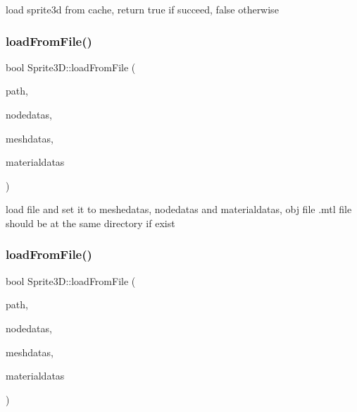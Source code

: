load sprite3d from cache, return true if succeed, false otherwise \mbox{\label{classSprite3D_a4927dfcc1a6cd4a2e7429b501da0d10d}} 
\subsubsection{\texorpdfstring{load\+From\+File()}{loadFromFile()}\hspace{0.1cm}{\footnotesize\ttfamily [1/2]}}
{\footnotesize\ttfamily bool Sprite3\+D\+::load\+From\+File (\begin{DoxyParamCaption}\item[{const std\+::string \&}]{path,  }\item[{\hyperlink{structNodeDatas}{Node\+Datas} $\ast$}]{nodedatas,  }\item[{\hyperlink{structMeshDatas}{Mesh\+Datas} $\ast$}]{meshdatas,  }\item[{\hyperlink{structMaterialDatas}{Material\+Datas} $\ast$}]{materialdatas }\end{DoxyParamCaption})}

load file and set it to meshedatas, nodedatas and materialdatas, obj file .mtl file should be at the same directory if exist \mbox{\label{classSprite3D_a4927dfcc1a6cd4a2e7429b501da0d10d}} 
\subsubsection{\texorpdfstring{load\+From\+File()}{loadFromFile()}\hspace{0.1cm}{\footnotesize\ttfamily [2/2]}}
{\footnotesize\ttfamily bool Sprite3\+D\+::load\+From\+File (\begin{DoxyParamCaption}\item[{const std\+::string \&}]{path,  }\item[{\hyperlink{structNodeDatas}{Node\+Datas} $\ast$}]{nodedatas,  }\item[{\hyperlink{structMeshDatas}{Mesh\+Datas} $\ast$}]{meshdatas,  }\item[{\hyperlink{structMaterialDatas}{Material\+Datas} $\ast$}]{materialdatas }\end{DoxyParamCaption})}

